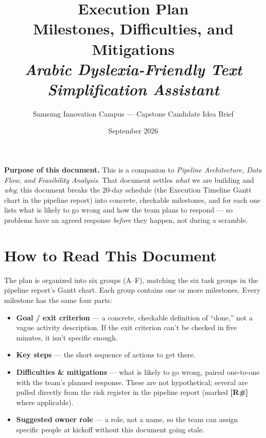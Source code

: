 \documentclass[11pt,a4paper]{article}
\title{\vspace{-1.5cm}\textbf{\Large Execution Plan}\\[4pt]
\large Milestones, Difficulties, and Mitigations \\[2pt]
\normalsize\itshape Arabic Dyslexia-Friendly Text Simplification Assistant}
\author{Samsung Innovation Campus --- Capstone Candidate Idea Brief}
\date{September 2026}
\begin{document}
\maketitle
\vspace{-0.8cm}

\begin{noteb}
\textbf{Purpose of this document.} This is a companion to
\emph{Pipeline Architecture, Data Flow, and Feasibility Analysis}. That
document settles \emph{what} we are building and \emph{why}; this document
breaks the 20-day schedule (the Execution Timeline Gantt chart in the
pipeline report) into concrete, checkable milestones, and for each one lists what is
likely to go wrong and how the team plans to respond --- so problems have an
agreed response \emph{before} they happen, not during a scramble.
\end{noteb}

\tableofcontents
\thispagestyle{empty}
\newpage

\section{How to Read This Document}

The plan is organized into six groups (A--F), matching the six task groups
in the pipeline report's Gantt chart. Each group contains one or more
milestones. Every milestone has the same four parts:

\begin{itemize}[leftmargin=1.4em]
  \item \textbf{Goal / exit criterion} --- a concrete, checkable definition
  of ``done,'' not a vague activity description. If the exit criterion can't
  be checked in five minutes, it isn't specific enough.
  \item \textbf{Key steps} --- the short sequence of actions to get there.
  \item \textbf{Difficulties \& mitigations} --- what is likely to go wrong,
  paired one-to-one with the team's planned response. These are not
  hypothetical; several are pulled directly from the risk register in the
  pipeline report (marked \textbf{[R\#]} where applicable).
  \item \textbf{Suggested owner role} --- a role, not a name, so the team can
  assign specific people at kickoff without this document going stale.
\end{itemize}
\end{document}
